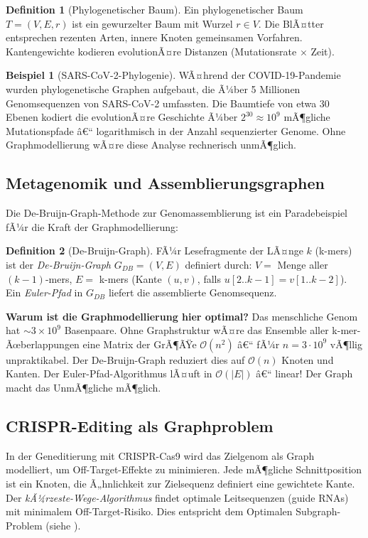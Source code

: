 ﻿\documentclass[12pt,a4paper,twoside]{article}
\theoremstyle{definition}
\newtheorem{definition}{Definition}[section]
\newtheorem{beispiel}{Beispiel}[section]
\theoremstyle{plain}
\theoremstyle{remark}
\begin{document}
\begin{definition}[Phylogenetischer Baum]
Ein phylogenetischer Baum $T=(V,E,r)$ ist ein gewurzelter Baum
mit Wurzel $r \in V$.  Die BlÃ¤tter entsprechen rezenten Arten,
innere Knoten gemeinsamen Vorfahren.  Kantengewichte kodieren
evolutionÃ¤re Distanzen (Mutationsrate $\times$ Zeit).
\end{definition}

\begin{beispiel}[SARS-CoV-2-Phylogenie]
WÃ¤hrend der COVID-19-Pandemie wurden phylogenetische Graphen
aufgebaut, die Ã¼ber 5 Millionen Genomsequenzen von SARS-CoV-2
umfassten.  Die Baumtiefe von etwa 30 Ebenen kodiert die
evolutionÃ¤re Geschichte Ã¼ber $2^{30} \approx 10^9$ mÃ¶gliche
Mutationspfade â€“ logarithmisch in der Anzahl sequenzierter
Genome.  Ohne Graphmodellierung wÃ¤re diese Analyse rechnerisch
unmÃ¶glich.
\end{beispiel}

\subsection{Metagenomik und Assemblierungsgraphen}

Die De-Bruijn-Graph-Methode zur Genomassemblierung
ist ein Paradebeispiel fÃ¼r die Kraft der Graphmodellierung:

\begin{definition}[De-Bruijn-Graph]
FÃ¼r Lesefragmente der LÃ¤nge $k$ (k-mers) ist der
\emph{De-Bruijn-Graph} $G_{DB}=(V,E)$ definiert durch:
$V = $ Menge aller $(k{-}1)$-mers, $E = $ k-mers
(Kante $(u,v)$, falls $u[2..k{-}1] = v[1..k{-}2]$).
Ein \emph{Euler-Pfad} in $G_{DB}$ liefert die assemblierte
Genomsequenz.
\end{definition}

\textbf{Warum ist die Graphmodellierung hier optimal?} Das menschliche Genom hat $\sim 3 \times 10^9$ Basenpaare. Ohne Graphstruktur wÃ¤re das Ensemble aller k-mer-Ãœberlappungen
eine Matrix der GrÃ¶ÃŸe $\mathcal{O}(n^2)$ â€“ fÃ¼r $n = 3 \cdot 10^9$
vÃ¶llig unpraktikabel.  Der De-Bruijn-Graph reduziert dies auf
$\mathcal{O}(n)$ Knoten und Kanten.  Der Euler-Pfad-Algorithmus
lÃ¤uft in $\mathcal{O}(|E|)$ â€“ linear!  Der Graph macht das
UnmÃ¶gliche mÃ¶glich.

\subsection{CRISPR-Editing als Graphproblem}

In der Geneditierung mit CRISPR-Cas9 wird das Zielgenom als
Graph modelliert, um Off-Target-Effekte zu minimieren.
Jede mÃ¶gliche Schnittposition ist ein Knoten, die Ã„hnlichkeit
zur Zielsequenz definiert eine gewichtete Kante.  Der
\emph{kÃ¼rzeste-Wege-Algorithmus} findet optimale Leitsequenzen
(guide RNAs) mit minimalem Off-Target-Risiko.  Dies entspricht
dem Optimalen Subgraph-Problem (siehe ).
\end{document}
